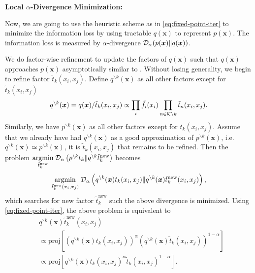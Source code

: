 \documentclass{article}
\begin{document}
\textbf{Local $\alpha$-Divergence Minimization:}

Now, we are going to use the heuristic scheme as in \autoref{eq:fixed-point-iter} to minimize the information loss by using tractable $q(\bm{x})$ to represent $p(\bm{x})$. The information loss is measured by $\alpha$-divergence $\mathcal{D}_{\alpha}(p(\bm{x}) \| q(\bm{x}))$.

We do factor-wise refinement to update the factors of $q(\bm{x})$ such that $q(\bm{x})$ approaches $p(\bm{x})$ asymptotically similar to \cite{divergence-measures-and-message-passing,Minka:2001:EPA:647235.720257}. Without losing generality, we begin to refine factor $\tilde{t}_k(x_i, x_j)$. Define $q^{\backslash k}(\bm{x})$ as all other factors except for $\tilde{t}_k(x_i, x_j)$
\begin{equation}
  q^{\backslash k}(\bm{x}) = q(\bm{x})/\tilde{t}_k(x_i, x_j) \propto \prod_{{i}} \tilde{f}_i(x_i) \prod_{n\in \mathcal{K} \backslash k} \tilde{t}_n(x_i, x_j).
\end{equation}
Similarly, we have $p^{\backslash k}(\bm{x})$ as all other factors except for $t_k(x_i, x_j)$. Assume that we already have had $q^{\backslash k}(\bm{x})$ as a good approximation of $p^{\backslash k}(\bm{x})$, i.e. $q^{\backslash k}(\bm{x}) \simeq p^{\backslash k}(\bm{x})$, it is $\tilde{t}_k(x_i, x_j)$ that remains to be refined. 
Then the problem $\underset{\tilde{t}_k^{\text{new}}}{\operatorname{argmin}}\; \mathcal{D}_{\alpha}\left(  p^{\backslash k}t_k\|q^{\backslash k}\tilde{t}_k^{\text{new}}\right)$ becomes \vspace{-0.3cm}
\begin{equation}
  \underset{\tilde{t}_k^{\text{new}}(x_i, x_j)}{\operatorname{argmin}}\; \mathcal{D}_{\alpha}\left(  q^{\backslash k}(\bm{x}) t_k(x_i, x_j)\|q^{\backslash k}(\bm{x}) \tilde{t}_k^{\text{new}}(x_i, x_j) \right),
\end{equation}
which searches for new factor $\tilde{t}_k^{\text{new}}$ such the above divergence is minimized.
Using \autoref{eq:fixed-point-iter}, the above problem is equivalent to
\begin{align}\label{eq:update-rule}
  &q^{\backslash k}(\bm{x}) \tilde{t}_k^{\text{new}}(x_i, x_j) \nonumber\\
  &\propto \text{proj}\left[ \left(q^{\backslash k}(\bm{x}) t_k(x_i, x_j)  \right)^{\alpha} \left(q^{\backslash k}(\bm{x}) \tilde{t}_k(x_i, x_j)  \right)^{1-\alpha} \right] \nonumber \\
  & \propto \text{proj}\left[ q^{\backslash k}(\bm{x}) t_k(x_i, x_j)^{\alpha} \tilde{t}_k(x_i, x_j)^{1-\alpha} \right].
\end{align}
\end{document}
